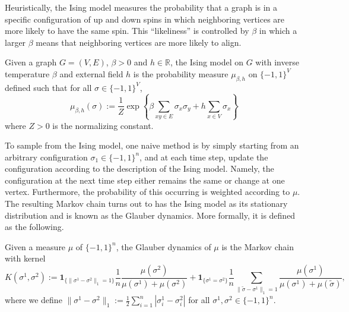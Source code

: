 Heuristically, the Ising model measures the probability that a graph is in a specific configuration of 
up and down spins in which neighboring vertices are more likely to have the same spin. This ``likeliness'' 
is controlled by \(\beta\) in which a larger \(\beta\) means that neighboring vertices are more likely to
align. 

\begin{definition}
  Given a graph \(G = (V, E)\), \(\beta > 0\) and \(h \in \mathbb{R}\), the Ising model on \(G\) 
  with inverse temperature \(\beta\) and external field \(h\) is the probability measure \(\mu_{\beta, h}\) on 
  \(\{-1, 1\}^V\) defined such that for all \(\sigma \in \{-1, 1\}^V\),
  \[\mu_{\beta, h}(\sigma) := 
    \frac{1}{Z} \exp\left\{\beta \sum_{xy \in E} \sigma_x \sigma_y + h \sum_{x \in V} \sigma_x\right\}\]
  where \(Z > 0\) is the normalizing constant.
\end{definition}


To sample from the Ising model, one naive method is by simply starting from an arbitrary configuration 
\(\sigma_1 \in \{-1, 1\}^n\), and at each time step, update the configuration according to the description 
of the Ising model. Namely, the configuration at the next time step either remains the 
same or change at one vertex. Furthermore, the probability of this occurring is weighted according to 
\(\mu\). The resulting Markov chain turns out to has the Ising model as its stationary distribution 
and is known as the Glauber dynamics. More formally, it is defined as the following.

\begin{definition}
  Given a measure \(\mu\) of \(\{-1, 1\}^n\), the Glauber dynamics of \(\mu\) is the Markov chain 
  with kernel 
  \begin{equation}\label{eq:glauber_ker}
    K(\sigma^1, \sigma^2) := 
      \mathbf{1}_{\{\|\sigma^1 - \sigma^2\|_1 = 1\}}\frac{1}{n}\frac{\mu(\sigma^2)}{\mu(\sigma^1) + \mu(\sigma^2)}
    + \mathbf{1}_{\{\sigma^1 = \sigma^2\}} \frac{1}{n}\sum_{\|\tilde \sigma - \sigma^1\|_1 = 1}
    \frac{\mu(\sigma^1)}{\mu(\sigma^1) + \mu(\tilde \sigma)},
  \end{equation}
  where we define \(\|\sigma^1 - \sigma^2\|_1 := \frac{1}{2}\sum_{i = 1}^n |\sigma_i^1 - \sigma_i^2|\) 
  for all \(\sigma^1, \sigma^2 \in \{-1, 1\}^n\).
\end{definition}

